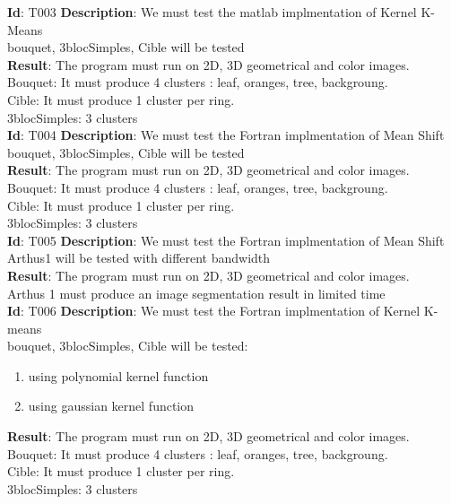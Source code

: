 \textbf{Id}: T003
\textbf{Description}: We must test the matlab implmentation of Kernel K-Means \\
bouquet, 3blocSimples, Cible will be tested\\
\textbf{Result}: The program must run on 2D, 3D geometrical and color images. \\
Bouquet: It must produce 4 clusters : leaf, oranges, tree, backgroung.\\
Cible: It must produce 1 cluster per ring.\\
3blocSimples: 3 clusters\\

\textbf{Id}: T004
\textbf{Description}: We must test the Fortran implmentation of Mean Shift \\
bouquet, 3blocSimples, Cible will be tested\\
\textbf{Result}: The program must run on 2D, 3D geometrical and color images. \\
Bouquet: It must produce 4 clusters : leaf, oranges, tree, backgroung.\\
Cible: It must produce 1 cluster per ring.\\
3blocSimples: 3 clusters\\

\textbf{Id}: T005
\textbf{Description}: We must test the Fortran implmentation of Mean Shift \\
Arthus1 will be tested with different bandwidth\\
\textbf{Result}: The program must run on 2D, 3D geometrical and color images. \\
Arthus 1 must produce an image segmentation result in limited time\\

\textbf{Id}: T006
\textbf{Description}: We must test the Fortran implmentation of Kernel K-means \\
bouquet, 3blocSimples, Cible will be tested: 
\begin{enumerate}
\item using polynomial kernel function
\item using gaussian kernel function
\end{enumerate}
\textbf{Result}: The program must run on 2D, 3D geometrical and color images. \\
Bouquet: It must produce 4 clusters : leaf, oranges, tree, backgroung.\\
Cible: It must produce 1 cluster per ring.\\
3blocSimples: 3 clusters\\

